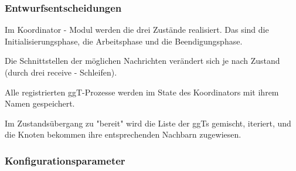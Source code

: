 \documentclass{article}
\begin{document}
\subsubsection{Entwurfsentscheidungen}
Im Koordinator - Modul werden die drei Zustände realisiert. Das sind die Initialisierungsphase, die Arbeitsphase und
die Beendigungsphase.

Die Schnittstellen der möglichen Nachrichten verändert sich je nach Zustand (durch drei receive - Schleifen).

Alle registrierten ggT-Prozesse werden im State des Koordinators mit ihrem Namen gespeichert.

Im Zustandsübergang zu "bereit"  wird die Liste der ggTs gemischt, iteriert, und die Knoten bekommen ihre entsprechenden Nachbarn zugewiesen.

\subsubsection{Konfigurationsparameter}
\end{document}
